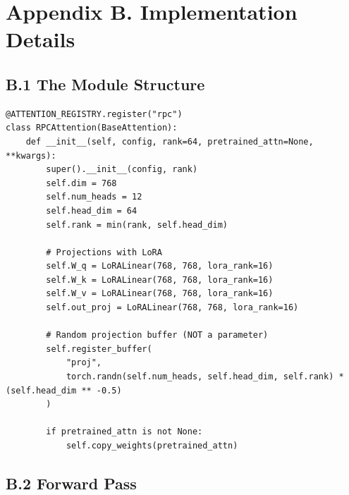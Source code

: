 
\section{Appendix B. Implementation Details}

\subsection{B.1 The Module Structure}

\begin{lstlisting}
@ATTENTION_REGISTRY.register("rpc")
class RPCAttention(BaseAttention):
    def __init__(self, config, rank=64, pretrained_attn=None, **kwargs):
        super().__init__(config, rank)
        self.dim = 768
        self.num_heads = 12
        self.head_dim = 64
        self.rank = min(rank, self.head_dim)
        
        # Projections with LoRA
        self.W_q = LoRALinear(768, 768, lora_rank=16)
        self.W_k = LoRALinear(768, 768, lora_rank=16)
        self.W_v = LoRALinear(768, 768, lora_rank=16)
        self.out_proj = LoRALinear(768, 768, lora_rank=16)
        
        # Random projection buffer (NOT a parameter)
        self.register_buffer(
            "proj",
            torch.randn(self.num_heads, self.head_dim, self.rank) * (self.head_dim ** -0.5)
        )
        
        if pretrained_attn is not None:
            self.copy_weights(pretrained_attn)
\end{lstlisting}

\subsection{B.2 Forward Pass}

